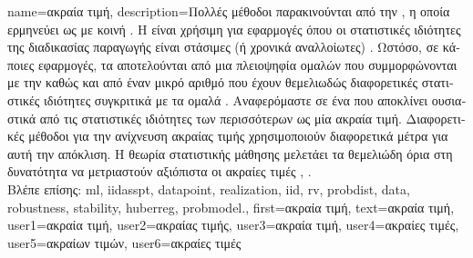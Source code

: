 {name={\foreignlanguage{greek}{ακραία τιμή}}, 
	description={\foreignlanguage{greek}{Πολλές μέθοδοι}   
		\foreignlanguage{greek}{παρακινούνται από την} , \foreignlanguage{greek}{η οποία ερμηνεύει} 
		 \foreignlanguage{greek}{ως}    
		\foreignlanguage{greek}{με κοινή} . \foreignlanguage{greek}{Η}  
		\foreignlanguage{greek}{είναι χρήσιμη για εφαρμογές όπου οι στατιστικές ιδιότητες της διαδικασίας παραγωγής} 
		 \foreignlanguage{greek}{είναι στάσιμες (ή χρονικά αναλλοίωτες)} \cite{Brockwell91}. 
		\foreignlanguage{greek}{Ωστόσο, σε κάποιες εφαρμογές, τα}  \foreignlanguage{greek}{αποτελούνται 
		από μια πλειοψηφία ομαλών}  \foreignlanguage{greek}{που συμμορφώνονται με την} 
		 \foreignlanguage{greek}{καθώς και από έναν μικρό αριθμό}  
		\foreignlanguage{greek}{που έχουν θεμελιωδώς διαφορετικές στατιστικές ιδιότητες συγκριτικά με τα ομαλά}  
        		. \foreignlanguage{greek}{Αναφερόμαστε σε ένα}  \foreignlanguage{greek}{που  
        		αποκλίνει ουσιαστικά από τις στατιστικές ιδιότητες των περισσότερων}  \foreignlanguage{greek}{ως μία
		ακραία τιμή. Διαφορετικές μέθοδοι για την  ανίχνευση ακραίας τιμής χρησιμοποιούν διαφορετικά μέτρα για αυτή την 
		απόκλιση. Η θεωρία στατιστικής μάθησης μελετάει τα θεμελιώδη όρια στη δυνατότητα να μετριαστούν αξιόπιστα 
		οι ακραίες τιμές} \cite{doi:10.1137/0222052}, \cite{10.1214/20-AOS1961}.\\
       		\foreignlanguage{greek}{Βλέπε επίσης:} \gls{ml}, \gls{iidasspt}, \gls{datapoint}, \gls{realization}, \gls{iid}, \gls{rv}, \gls{probdist}, \gls{data}, 
		\gls{robustness}, \gls{stability}, \gls{huberreg}, \gls{probmodel}.},
	  first={\foreignlanguage{greek}{ακραία τιμή}}, 
	  text={\foreignlanguage{greek}{ακραία τιμή}},
	  user1={\foreignlanguage{greek}{ακραία τιμή}}, %
  	  user2={\foreignlanguage{greek}{ακραίας τιμής}}, %
	  user3={\foreignlanguage{greek}{ακραία τιμή}}, %
  	  user4={\foreignlanguage{greek}{ακραίες τιμές}}, %
	  user5={\foreignlanguage{greek}{ακραίων τιμών}}, %
  	  user6={\foreignlanguage{greek}{ακραίες τιμές}} %
}

